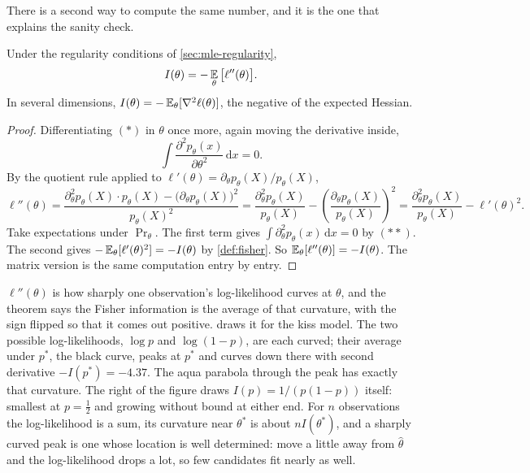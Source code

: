 There is a second way to compute the same number, and it is the one that explains the sanity check.

\begin{theorem}
\label{thm:fisher-curvature}
Under the regularity conditions of \cref{sec:mle-regularity},
\[
I(\theta) = -\operatorname*{\mathbb{E}}_\theta\big[\ell''(\theta)\big].
\]
In several dimensions, $I(\theta) = -\operatorname*{\mathbb{E}}_\theta[\nabla^2\ell(\theta)]$, the negative of the expected Hessian.
\end{theorem}

\begin{proof}
Differentiating $(\ast)$ in $\theta$ once more, again moving the derivative inside,
\[
\int \frac{\partial^2 p_\theta(x)}{\partial\theta^2}\,\mathrm{d}x = 0. \tag{$\ast\ast$}
\]
By the quotient rule applied to $\ell'(\theta) = \partial_\theta p_\theta(X)/p_\theta(X)$,
\[
\ell''(\theta) = \frac{\partial^2_\theta p_\theta(X)\cdot p_\theta(X) - \big(\partial_\theta p_\theta(X)\big)^2}{p_\theta(X)^2} = \frac{\partial^2_\theta p_\theta(X)}{p_\theta(X)} - \left(\frac{\partial_\theta p_\theta(X)}{p_\theta(X)}\right)^2 = \frac{\partial^2_\theta p_\theta(X)}{p_\theta(X)} - \ell'(\theta)^2.
\]
Take expectations under $\Pr_\theta$.
The first term gives $\int \partial^2_\theta p_\theta(x)\,\mathrm{d}x = 0$ by $(\ast\ast)$.
The second gives $-\operatorname*{\mathbb{E}}_\theta[\ell'(\theta)^2] = -I(\theta)$ by \cref{def:fisher}.
So $\operatorname*{\mathbb{E}}_\theta[\ell''(\theta)] = -I(\theta)$.
The matrix version is the same computation entry by entry.
\end{proof}

\begin{intuition}
$\ell''(\theta)$ is how sharply one observation's log-likelihood curves at $\theta$, and the theorem says the Fisher information is the average of that curvature, with the sign flipped so that it comes out positive.
 draws it for the kiss model.
The two possible log-likelihoods, $\log p$ and $\log(1-p)$, are each curved; their average under $p^*$, the black curve, peaks at $p^*$ and curves down there with second derivative $-I(p^*) = -4.37$.
The aqua parabola through the peak has exactly that curvature.
The right of the figure draws $I(p) = 1/(p(1 - p))$ itself: smallest at $p = \frac12$ and growing without bound at either end.
For $n$ observations the log-likelihood is a sum, its curvature near $\theta^*$ is about $nI(\theta^*)$, and a sharply curved peak is one whose location is well determined: move a little away from $\hat{\theta}$ and the log-likelihood drops a lot, so few candidates fit nearly as well.
\end{intuition}


